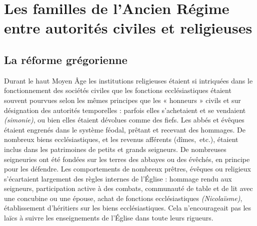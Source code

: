 

\chapter[Les familles de l'Ancien Régime entre autorités civiles et religieuses]{Les familles de l'Ancien Régime\\entre autorités civiles et religieuses}


\section{La réforme grégorienne}

 Durant le haut Moyen Âge les institutions religieuses étaient si intriquées dans le fonctionnement des sociétés civiles que les fonctions ecclésiastiques étaient souvent pourvues selon les mêmes principes que les « honneurs » civils et sur désignation des autorités temporelles : parfois elles s'achetaient et se vendaient \emph{(simonie)}, ou bien elles étaient dévolues comme des fiefs. Les abbés et évêques étaient engrenés dans le système féodal, prêtant et recevant des hommages. De nombreux biens ecclésiastiques, et les revenus afférents (dîmes,~etc.), étaient inclus dans les patrimoines de petits et grands seigneurs. De nombreuses seigneuries ont été fondées sur les terres des abbayes ou des évêchés, en principe pour les défendre. Les comportements de nombreux prêtres, évêques ou religieux s'écartaient largement des règles internes de l'Église : hommage rendu aux seigneurs, participation active à des combats, communauté de table et de lit avec une concubine ou une épouse, achat de fonctions ecclésiastiques \emph{(Nicolaïsme)}, établissement d'héritiers sur les biens ecclésiastiques. Cela n'encourageait pas les laïcs à suivre les enseignements de l'Église dans toute leurs rigueurs. 

